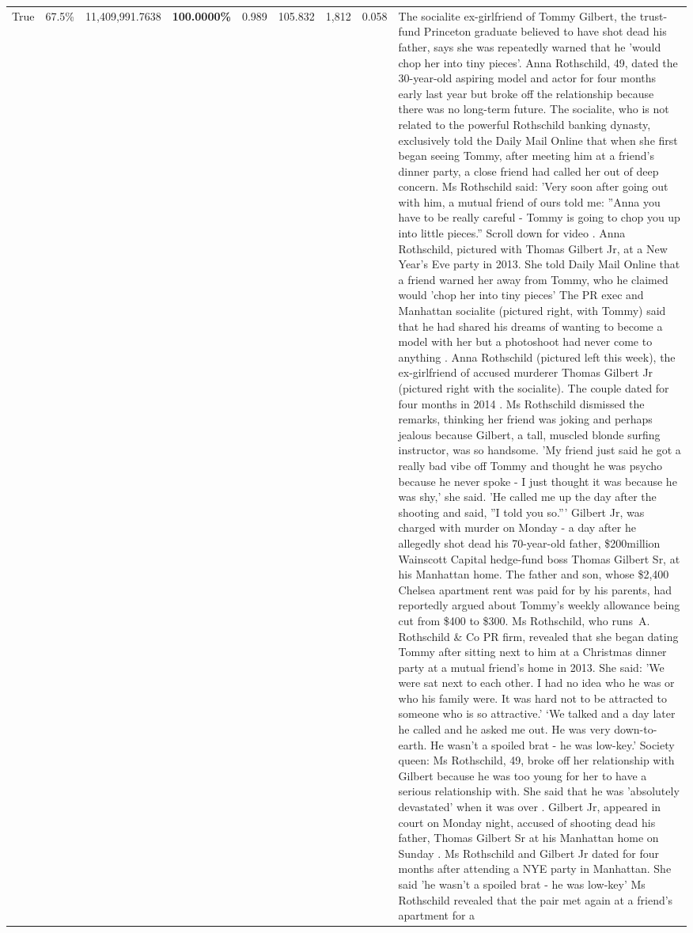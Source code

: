 \begin{table}[H]
\begin{tabular}{lllrlllll}
True & 67.5\% & 11,409,991.7638 & \bfseries \color{red} 100.0000\% & 0.989 & 105.832 & 1,812 & 0.058 & The socialite ex-girlfriend of Tommy Gilbert, the trust-fund Princeton graduate believed to have shot dead his father, says she was repeatedly warned that he 'would chop her into tiny pieces'. Anna Rothschild, 49, dated the 30-year-old aspiring model and actor for four months early last year but broke off the relationship because there was no long-term future. The socialite, who is not related to the powerful Rothschild banking dynasty, exclusively told the Daily Mail Online that when she first began seeing Tommy, after meeting him at a friend's dinner party, a close friend had called her out of deep concern. Ms Rothschild said: 'Very soon after going out with him, a mutual friend of ours told me: ''Anna you have to be really careful - Tommy is going to chop you up into little pieces.'' Scroll down for video . Anna Rothschild, pictured with Thomas Gilbert Jr, at a New Year's Eve party in 2013. She told Daily Mail Online that a friend warned her away from Tommy, who he claimed would 'chop her into tiny pieces' The PR exec and Manhattan socialite (pictured right, with Tommy) said that he had shared his dreams of wanting to become a model with her but a photoshoot had never come to anything . Anna Rothschild (pictured left this week), the ex-girlfriend of accused murderer Thomas Gilbert Jr (pictured right with the socialite). The couple dated for four months in 2014 . Ms Rothschild dismissed the remarks, thinking her friend was joking and perhaps jealous because Gilbert, a tall, muscled blonde surfing instructor, was so handsome. 'My friend just said he got a really bad vibe off Tommy and thought he was psycho because he never spoke - I just thought it was because he was shy,' she said. 'He called me up the day after the shooting and said, ''I told you so.''' Gilbert Jr, was charged with murder on Monday - a day after he allegedly shot dead his 70-year-old father, \$200million Wainscott Capital hedge-fund boss Thomas Gilbert Sr, at his Manhattan home. The father and son, whose \$2,400 Chelsea apartment rent was paid for by his parents, had reportedly argued about Tommy's weekly allowance being cut from \$400 to \$300. Ms Rothschild, who runs A. Rothschild \& Co PR firm, revealed that she began dating Tommy after sitting next to him at a Christmas dinner party at a mutual friend's home in 2013. She said: 'We were sat next to each other. I had no idea who he was or who his family were. It was hard not to be attracted to someone who is so attractive.' ‘We talked and a day later he called and he asked me out. He was very down-to-earth. He wasn’t a spoiled brat - he was low-key.’ Society queen: Ms Rothschild, 49, broke off her relationship with Gilbert because he was too young for her to have a serious relationship with. She said that he was 'absolutely devastated' when it was over . Gilbert Jr, appeared in court on Monday night, accused of shooting dead his father, Thomas Gilbert Sr at his Manhattan home on Sunday . Ms Rothschild and Gilbert Jr dated for four months after attending a NYE party in Manhattan. She said 'he wasn't a spoiled brat - he was low-key' Ms Rothschild revealed that the pair met again at a friend’s apartment for a 
\end{tabular}
\end{table}
